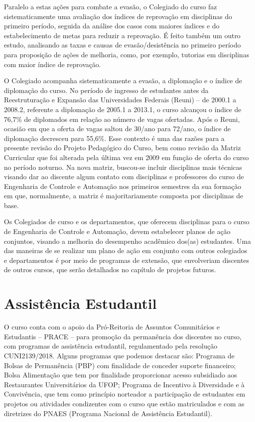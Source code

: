 \documentclass[
	12pt,				%
	openright,			%
	oneside,			%
	a4paper,			%
	english,			%
	brazil				%
	]{abntex2}
\begin{document}
Paralelo a estas ações para combate a evasão, o Colegiado do curso faz sistematicamente uma avaliação dos índices de reprovação em disciplinas do primeiro período, seguida da análise dos casos com maiores índices e do estabelecimento de metas para reduzir a reprovação. É feito também um outro estudo, analisando as taxas e causas de evasão/desistência no primeiro período para proposição de ações de melhoria, como, por exemplo, tutorias em disciplinas com maior índice de reprovação.

O Colegiado acompanha sistematicamente a evasão, a diplomação e o índice de diplomação do curso. No período de ingresso de estudantes antes da Reestruturação e Expansão das Universidades Federais (Reuni) – de 2000.1 a 2008.2, referente a diplomação de 2005.1 a 2013.1, o curso alcançou o índice de 76,7\% de diplomados em relação ao número de vagas ofertadas. Após o Reuni, ocasião em que a oferta de vagas saltou de 30/ano para 72/ano, o índice de diplomação decresceu para 55,6\%. Esse contexto é uma das razões para a presente revisão do Projeto Pedagógico do Curso, bem como revisão da Matriz Curricular que foi alterada pela última vez em 2009 em função de oferta do curso no período noturno. Na nova matriz, buscou-se incluir disciplinas mais técnicas visando dar ao discente algum contato com disciplinas e professores do curso de Engenharia de Controle e Automação nos primeiros semestres da sua formação em que, normalmente, a matriz é majoritariamente composta por disciplinas de base.

Os Colegiados de curso e os departamentos, que oferecem disciplinas para o curso de Engenharia de Controle e Automação, devem estabelecer planos de ação conjuntos, visando a melhoria do desempenho acadêmico dos(as) estudantes. Uma das maneiras de se realizar um plano de ação em conjunto com outros colegiados e departamentos é por meio de programas de extensão, que envolveriam discentes de outros cursos, que serão detalhados no capítulo de projetos futuros.
%
\section{Assistência Estudantil}
O curso conta com o apoio da Pró-Reitoria de Assuntos Comunitários e Estudantis -- PRACE -- para promoção da permanência dos discentes no curso, com programas de assistência estudantil, regulamentado pela resolução CUNI2139/2018. Alguns programas que podemos destacar são: Programa de Bolsas de Permanência (PBP) com finalidade de conceder suporte financeiro; Bolsa Alimentação que tem por finalidade proporcionar acesso subsidiado aos Restaurantes Universitários da UFOP; Programa de Incentivo à Diversidade e à Convivência, que tem como princípio norteador a participação de estudantes em projetos ou atividades condizentes com o curso que estão matriculados e com as diretrizes do PNAES (Programa Nacional de Assistência Estudantil).
\end{document}

